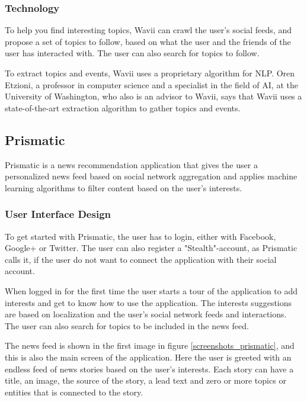 \subsubsection{Technology}
To help you find interesting topics, Wavii can crawl the user's social feeds, and propose a set of topics to follow, based on what the user and the friends of the user has interacted with. The user can also search for topics to follow.

To extract topics and events, Wavii uses a proprietary algorithm for NLP\cite{wavii_proprietary_algorithm}. Oren Etzioni, a professor in computer science and a specialist in the field of AI, at the University of Washington, who also is an advisor to Wavii, says that Wavii uses a state-of-the-art extraction algorithm to gather topics and events\cite{wavii_facebook_for_topics}.

\subsection{Prismatic}
Prismatic is a news recommendation application that gives the user a personalized news feed based on social network aggregation and applies machine learning algorithms to filter content based on the user's interests\cite{prismatic_wikipedia}.

\subsubsection{User Interface Design}
To get started with Prismatic, the user has to login, either with Facebook, Google+ or Twitter. The user can also register a "Stealth"-account, as Prismatic calls it, if the user do not want to connect the application with their social account.

When logged in for the first time the user starts a tour of the application to add interests and get to know how to use the application. The interests suggestions are based on localization and the user's social network feeds and interactions. The user can also search for topics to be included in the news feed.

The news feed is shown in the first image in figure \ref{screenshots_prismatic}, and this is also the main screen of the application. Here the user is greeted with an endless feed of news stories based on the user's interests. Each story can have a title, an image, the source of the story, a lead text and zero or more topics or entities that is connected to the story.

